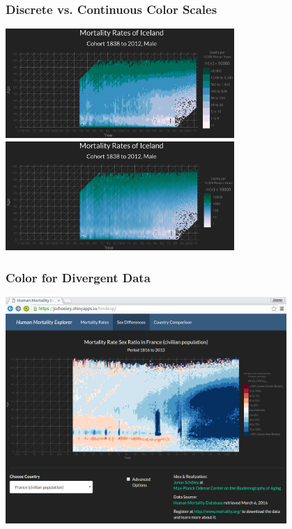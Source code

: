 \documentclass[hyperref={bookmarks=false}]{beamer}
\begin{document}

\begin{frame}
\frametitle{Discrete vs. Continuous Color Scales}

\center\includegraphics[width = 0.65\textwidth]{./fig/discrete.png}\\
\center\includegraphics[width = 0.65\textwidth]{./fig/cont.png}


\end{frame}


\begin{frame}
\frametitle{Color for Divergent Data}

\center\includegraphics[width = 0.8\textwidth]{./fig/divergent.png}


\end{frame}
\end{document}
